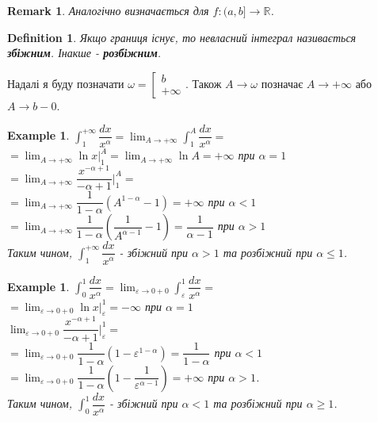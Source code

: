\documentclass[a4paper, 10pt]{article}
\def\huge{\displaystyle}
\theoremstyle{theoremdd}
\theoremstyle{theoremdd}
\newtheorem{definition}[theorem]{Definition}
\theoremstyle{theoremdd}
\theoremstyle{theoremdd}
\newtheorem{example}[theorem]{Example}
\theoremstyle{theoremdd}
\theoremstyle{theoremdd}
\newtheorem{remark}[theorem]{Remark}
\theoremstyle{theoremdd}
\theoremstyle{theoremdd}
\begin{document}
\begin{remark}
Аналогічно визначається для $f: (a,b] \to \mathbb{R}$.
\end{remark}

\begin{definition}
Якщо границя існує, то невласний інтеграл називається \textbf{збіжним}. Інакше - \textbf{розбіжним}.
\end{definition}

Надалі я буду позначати $\omega = \left[ \begin{gathered} b \\ +\infty \end{gathered} \right.$. Також $A \to \omega$ позначає $A \to +\infty$ або $A \to b-0$.

\begin{example}
$\huge\int_1^{+\infty} \dfrac{dx}{x^\alpha} = \huge\lim_{A \to +\infty} \int_1^A \dfrac{dx}{x^\alpha} \boxed{=}$\\
$= \huge\lim_{A \to +\infty} \ln x \Big|_1^A = \lim_{A \to +\infty} \ln A = +\infty$ при $\alpha = 1$\\
$= \huge\lim_{A \to +\infty} \dfrac{x^{-\alpha+1}}{-\alpha+1} \Big|_1^A =$\\
$= \huge\lim_{A \to +\infty} \dfrac{1}{1-\alpha} (A^{1-\alpha} - 1) = +\infty$ при $\alpha < 1$\\
$= \huge\lim_{A \to +\infty} \dfrac{1}{1-\alpha} (\dfrac{1}{A^{\alpha-1}} - 1) = \dfrac{1}{\alpha - 1}$ при $\alpha > 1$\\
Таким чином, $\huge\int_1^{+\infty} \dfrac{dx}{x^\alpha}$ - збіжний при $\alpha > 1$ та розбіжний при $\alpha \leq 1$.
\end{example}

\begin{example}
$\huge\int_0^1 \dfrac{dx}{x^{\alpha}} = \lim_{\varepsilon \to 0+0} \int_\varepsilon^1 \dfrac{dx}{x^{\alpha}} \boxed{=}$\\
$= \lim_{\varepsilon \to 0+0} \ln x \Big|_\varepsilon^1 = -\infty$ при $\alpha = 1$\\
$\huge\lim_{\varepsilon \to 0+0} \dfrac{x^{-\alpha+1}}{-\alpha+1} \Big|_\varepsilon^1 =$\\
$=\huge\lim_{\varepsilon \to 0+0} \dfrac{1}{1-\alpha} \left( 1 - \varepsilon^{1-\alpha} \right) = \dfrac{1}{1-\alpha}$ при $\alpha < 1$\\
$=\huge\lim_{\varepsilon \to 0+0} \dfrac{1}{1-\alpha} \left( 1 - \dfrac{1}{\varepsilon^{\alpha-1}} \right) = +\infty$ при $\alpha > 1$.\\
Таким чином, $\huge\int_0^1 \dfrac{dx}{x^\alpha}$ - збіжний при $\alpha < 1$ та розбіжний при $\alpha \geq 1$.
\end{example}
\end{document}
